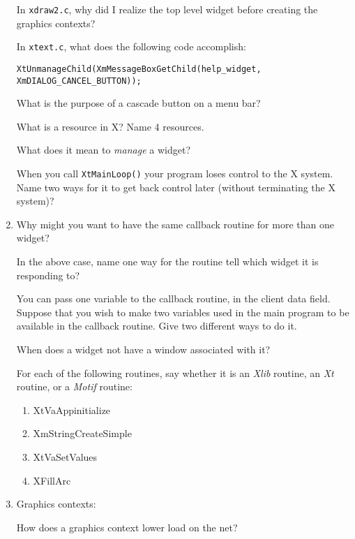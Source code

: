\documentclass[twoside]{article}
\begin{document}
\begin{enumerate}
 In \texttt{xdraw2.c}, why did I realize the top level
widget before creating the graphics contexts?


 In \texttt{xtext.c}, what does the following code
accomplish:
\begin{verbatim}
XtUnmanageChild(XmMessageBoxGetChild(help_widget, XmDIALOG_CANCEL_BUTTON));
\end{verbatim}


 What is the purpose of a cascade button on a menu bar?


What is a resource in X?  Name 4 resources.

  What does it mean to \emph{manage} a widget?


When you call {\tt XtMainLoop()} your program loses control to the
X system.  Name two ways for it to get back control later (without
terminating the X system)?


\item
\begin{enumerate}

Why might you want to have the same callback routine for more than one
widget?

In the above case, name one way for the routine tell which widget
it is responding to?
\end{enumerate}


 You can pass one variable to the callback routine, in the client
data field.  Suppose that you wish to make two variables used in
the main program to be available in the callback routine.  Give
two different ways to do it.



 When does a widget not have a window associated with it?


For each of the following routines, say whether it is an
\emph{Xlib} routine, an \emph{Xt} routine, or a \emph{Motif}
routine:
\begin{enumerate}
\setlength{\itemsep}{0in}
\item XtVaAppinitialize
\item XmStringCreateSimple
\item  XtVaSetValues
\item XFillArc
\end{enumerate}


\item Graphics contexts:
\begin{enumerate}
 How does a graphics context lower load on the net?



\end{enumerate}
\end{enumerate}
\end{document}
